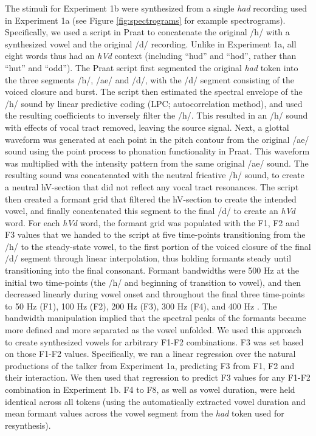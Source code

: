 \documentclass[preprint]{JASA}
\begin{document}
The stimuli for Experiment 1b were synthesized from a single \emph{had} recording used in Experiment 1a (see Figure \ref{fig:spectrograms} for example spectrograms). Specifically, we used a script \citep[based on descriptions in][]{wade2007} in Praat \citep{boersma-weenink2022} to concatenate the original /h/ with a synthesized vowel and the original /d/ recording. Unlike in Experiment 1a, all eight words thus had an \emph{hVd} context (including ``hud'' and ``hod'', rather than ``hut'' and ``odd''). The Praat script first segmented the original \emph{had} token into the three segments /h/, /ae/ and /d/, with the /d/ segment consisting of the voiced closure and burst. The script then estimated the spectral envelope of the /h/ sound by linear predictive coding (LPC; autocorrelation method), and used the resulting coefficients to inversely filter the /h/. This resulted in an /h/ sound with effects of vocal tract removed, leaving the source signal. Next, a glottal waveform was generated at each point in the pitch contour from the original /ae/ sound using the point process to phonation functionality in Praat. This waveform was multiplied with the intensity pattern from the same original /ae/ sound. The resulting sound was concatenated with the neutral fricative /h/ sound, to create a neutral hV-section that did not reflect any vocal tract resonances. The script then created a formant grid that filtered the hV-section to create the intended vowel, and finally concatenated this segment to the final /d/ to create an \emph{hVd} word. For each \emph{hVd} word, the formant grid was populated with the F1, F2 and F3 values that we handed to the script at five time-points transitioning from the /h/ to the steady-state vowel, to the first portion of the voiced closure of the final /d/ segment through linear interpolation, thus holding formants steady until transitioning into the final consonant. Formant bandwidths were 500 Hz at the initial two time-points (the /h/ and beginning of transition to vowel), and then decreased linearly during vowel onset and throughout the final three time-points to 50 Hz (F1), 100 Hz (F2), 200 Hz (F3), 300 Hz (F4), and 400 Hz \citep[F5-F8, following][]{wade2007}. The bandwidth manipulation implied that the spectral peaks of the formants became more defined and more separated as the vowel unfolded. We used this approach to create synthesized vowels for arbitrary F1-F2 combinations. F3 was set based on those F1-F2 values. Specifically, we ran a linear regression over the natural productions of the talker from Experiment 1a, predicting F3 from F1, F2 and their interaction. We then used that regression to predict F3 values for any F1-F2 combination in Experiment 1b. F4 to F8, as well as vowel duration, were held identical across all tokens (using the automatically extracted vowel duration and mean formant values across the vowel segment from the \emph{had} token used for resynthesis).
\end{document}
